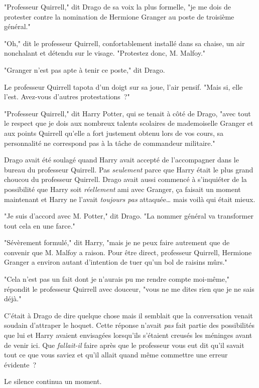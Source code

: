 \later

"Professeur Quirrell," dit Drago de sa voix la plus formelle, "je me dois de protester contre la nomination de Hermione Granger au poste de troisième général."

"Oh," dit le professeur Quirrell, confortablement installé dans sa chaise, un air nonchalant et détendu sur le visage. "Protestez donc, M. Malfoy."

"Granger n'est pas apte à tenir ce poste," dit Drago.

Le professeur Quirrell tapota d'un doigt sur sa joue, l'air pensif. "Mais si, elle l'est. Avez-vous d'autres protestations~?"

"Professeur Quirrell," dit Harry Potter, qui se tenait à côté de Drago, "avec tout le respect que je dois aux nombreux talents scolaires de mademoiselle Granger et aux points Quirrell qu'elle a fort justement obtenu lors de vos cours, sa personnalité ne correspond pas à la tâche de commandeur militaire."

Drago avait été soulagé quand Harry avait accepté de l'accompagner dans le bureau du professeur Quirrell. Pas \emph{seulement} parce que Harry était le plus grand choucou du professeur Quirrell. Drago avait aussi commencé à s'inquiéter de la possibilité que Harry soit \emph{réellement} ami avec Granger, ça faisait un moment maintenant et Harry ne l'avait \emph{toujours pas} attaquée… mais voilà qui était mieux.

"Je suis d'accord avec M. Potter," dit Drago. "La nommer général va transformer tout cela en une farce."

"Sévèrement formulé," dit Harry, "mais je ne peux faire autrement que de convenir que M. Malfoy a raison. Pour être direct, professeur Quirrell, Hermione Granger a environ autant d'intention de tuer qu'un bol de raisins mûrs."

"Cela n'est pas un fait dont je n'aurais pu me rendre compte moi-même," répondit le professeur Quirrell avec douceur, "vous ne me dites rien que je ne sais déjà."

C'était à Drago de dire quelque chose mais il semblait que la conversation venait soudain d'attraper le hoquet. Cette réponse n'avait \emph{pas} fait partie des possibilités que lui et Harry avaient envisagées lorsqu'ils s'étaient creusés les méninges avant de venir ici. Que \emph{fallait-il} faire après que le professeur vous eut dit qu'il savait tout ce que vous saviez et qu'il allait quand même commettre une erreur évidente~?

Le silence continua un moment.

